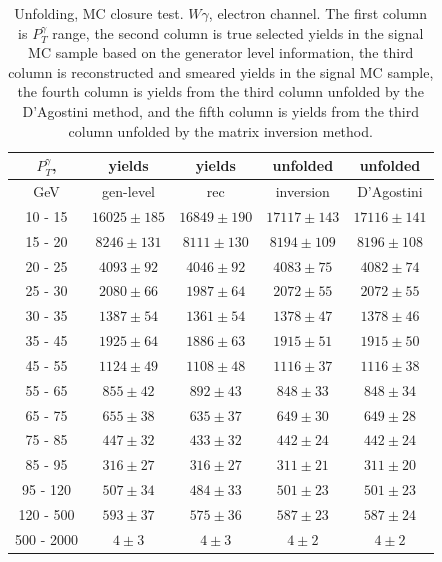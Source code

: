 \begin{table}[h]
  \scriptsize
  \begin{center}
  \caption{Unfolding, MC closure test. $W\gamma$, electron channel. The first column is $P_T^{\gamma}$ range, the second column is true selected yields in the signal MC sample based on the generator level information, the third column is reconstructed and smeared yields in the signal MC sample, the fourth column is yields from the third column unfolded by the D'Agostini method, and the fifth column is yields from the third column unfolded by the matrix inversion method. }
  \begin{tabular}{|c|c|c|c|c|}
  \hline
  $P_T^{\gamma}$, &  yields &   yields &  unfolded &  unfolded \\ \hline
  GeV &  gen-level & rec &  inversion &  D'Agostini \\ \hline
 10 -  15 &     $16025\pm 185$ &     $16849\pm 190$ &     $17117\pm143$ &     $17116\pm141$ \\ \hline
 15 -  20 &     $8246\pm 131$ &     $8111\pm 130$ &     $8194\pm109$ &     $8196\pm108$ \\ \hline
 20 -  25 &     $4093\pm  92$ &     $4046\pm  92$ &     $4083\pm75$ &     $4082\pm74$ \\ \hline
 25 -  30 &     $2080\pm  66$ &     $1987\pm  64$ &     $2072\pm55$ &     $2072\pm55$ \\ \hline
 30 -  35 &     $1387\pm  54$ &     $1361\pm  54$ &     $1378\pm47$ &     $1378\pm46$ \\ \hline
 35 -  45 &     $1925\pm  64$ &     $1886\pm  63$ &     $1915\pm51$ &     $1915\pm50$ \\ \hline
 45 -  55 &     $1124\pm  49$ &     $1108\pm  48$ &     $1116\pm37$ &     $1116\pm38$ \\ \hline
 55 -  65 &     $855\pm  42$ &     $892\pm  43$ &     $848\pm33$ &     $848\pm34$ \\ \hline
 65 -  75 &     $655\pm  38$ &     $635\pm  37$ &     $649\pm30$ &     $649\pm28$ \\ \hline
 75 -  85 &     $447\pm  32$ &     $433\pm  32$ &     $442\pm24$ &     $442\pm24$ \\ \hline
 85 -  95 &     $316\pm  27$ &     $316\pm  27$ &     $311\pm21$ &     $311\pm20$ \\ \hline
 95 - 120 &     $507\pm  34$ &     $484\pm  33$ &     $501\pm23$ &     $501\pm23$ \\ \hline
120 - 500 &     $593\pm  37$ &     $575\pm  36$ &     $587\pm23$ &     $587\pm24$ \\ \hline
500 - 2000 &     $4\pm   3$ &     $4\pm   3$ &     $4\pm2$ &     $4\pm2$ \\ \hline
  \end{tabular}
  \label{tab:unf_mc_closure_ELECTRON_WGamma}
  \end{center}
\end{table}
\clearpage
